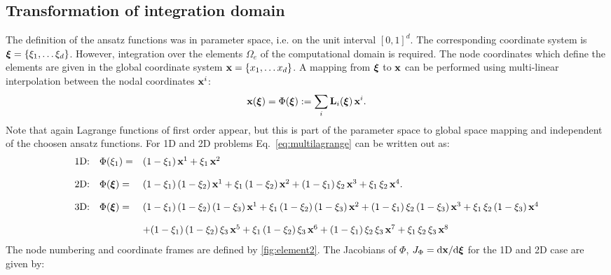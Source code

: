\subsection{Transformation of integration domain}
The definition of the ansatz functions was in parameter space, i.e. on the unit interval $[0,1]^d$. The corresponding coordinate system is $\boldsymbol{\xi} = \{\xi_1, \dots \xi_d\}$. However, integration over the elements $\Omega_e$ of the computational domain is required. The node coordinates which define the elements are given in the global coordinate system $\textbf{x} = \{x_1, \dots x_d\}$. A mapping from $\boldsymbol{\xi}$ to $\textbf{x}$ can be performed using multi-linear interpolation between the nodal coordinates $\textbf{x}^i$:
\begin{equation}\label{eq:multilagrange}
  \begin{array}{ll}
    \textbf{x}(\boldsymbol{\xi}) = \Phi(\boldsymbol{\xi}) := \displaystyle\sum\limits_{i} \textbf{L}_i(\boldsymbol{\xi})\,\textbf{x}^i.
  \end{array}
\end{equation}
Note that again Lagrange functions of first order appear, but this is part of the parameter space to global space mapping and independent of the choosen ansatz functions. For 1D and 2D problems Eq.~\eqref{eq:multilagrange} can be written out as:
\begin{equation}\label{eq:fe_phi}
  \begin{array}{ll}
    \text{1D:}\quad
    \Phi(\xi_1) =& (1-\xi_1)\,\textbf{x}^1 + \xi_1\,\textbf{x}^2\\[4mm]
    \text{2D:}\quad
    \Phi(\boldsymbol{\xi}) =& (1-\xi_1)\,(1-\xi_2)\,\textbf{x}^1 + \xi_1\,(1-\xi_2)\,\textbf{x}^2 + (1-\xi_1)\,\xi_2\,\textbf{x}^3 + \xi_1\,\xi_2\,\textbf{x}^4.\\[4mm]
    \text{3D:}\quad
    \Phi(\boldsymbol{\xi}) =& 
      (1-\xi_1)\,(1-\xi_2)\,(1-\xi_3)\,\textbf{x}^1 + \xi_1\,(1-\xi_2)\,(1-\xi_3)\,\textbf{x}^2 + (1-\xi_1)\,\xi_2\,(1-\xi_3)\,\textbf{x}^3 + \xi_1\,\xi_2\,(1-\xi_3)\,\textbf{x}^4\\[4mm]
      &+ (1-\xi_1)\,(1-\xi_2)\,\xi_3\,\textbf{x}^5 + \xi_1\,(1-\xi_2)\,\xi_3\,\textbf{x}^6 + (1-\xi_1)\,\xi_2\,\xi_3\,\textbf{x}^7 + \xi_1\,\xi_2\,\xi_3\,\textbf{x}^8
    
  \end{array}
\end{equation}
The node numbering and coordinate frames are defined by \cref{fig:element2}.
The Jacobians of $\Phi$, ${J_\Phi = \d \bfx/\d \bfxi}$ for the 1D and 2D case are given by:
